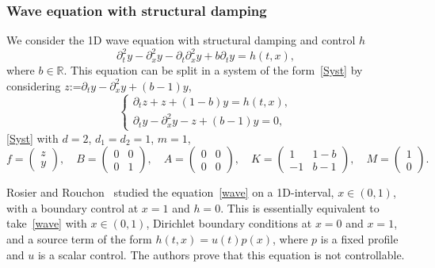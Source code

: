 \documentclass[JEP,XML,SOM,Unicode,NoEqCountersInSection]{cedram}
\theoremstyle{plain}
\theoremstyle{definition}
\theoremstyle{remark}
\newcommand{\set}{\mathbb}
\newcommand{\R}{} %
\renewcommand{\R}{\set{R}}
\newcommand{\coloneqq}{\mathrel{\mathord{:}\mathord=}}
\begin{document}
\subsubsection{Wave equation with structural damping}
We consider the 1D wave equation with structural damping and control $h$\vspace*{-3pt}\enlargethispage{\baselineskip}%
\begin{equation} \label{wave}
\partial_t^2 y - \partial_x^2 y -\partial_t\partial_x^2y + b \partial_t y = h(t,x),
\end{equation}
where $b\in\R$. This equation can be split in a system of the form~\eqref{Syst} by considering $z\coloneqq \partial_t y - \partial_x^2 y+(b-1)y$,\vspace*{-3pt}
\begin{equation} \label{wave_syst}
\begin{cases}
\partial_t z+z+(1-b)y= h(t,x), \\
\partial_t y-\partial_x^2 y -z + (b-1)y =0,
\end{cases}
\end{equation}
\ie \eqref{Syst} with $d=2$, $d_1=d_2=1$, $m=1$,\vspace*{-3pt}
\begin{equation} \label{wave_matrix}
f=\begin{pmatrix}
z \\ y
\end{pmatrix}, \quad
B=\begin{pmatrix}
0 & 0 \\ 0 & 1
\end{pmatrix}, \quad
A=\begin{pmatrix}
0 & 0 \\ 0 & 0
\end{pmatrix}, \quad
K=\begin{pmatrix}
1 & 1-b \\ -1 & b-1
\end{pmatrix}, \quad
M=\begin{pmatrix}
1 \\ 0
\end{pmatrix}.
\end{equation}

Rosier and Rouchon~\cite{rosier_2007} studied the equation~\eqref{wave} on a 1D-interval, $x\in (0,1)$, with a boundary control at $x=1$ and $h=0$. This is essentially equivalent to take~\eqref{wave} with $x\in(0,1)$, Dirichlet boundary conditions at $x=0$ and $x=1$, and a source term of the form $h(t,x)=u(t)p(x)$, where $p$ is a fixed profile and $u$ is a scalar control. The authors prove that this equation is not controllable.
\end{document}
